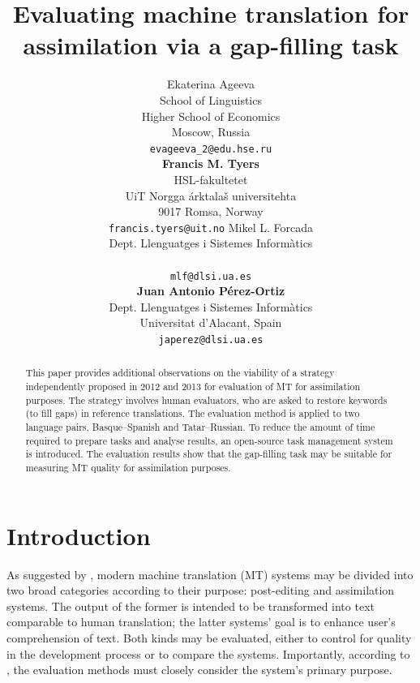 \documentclass[11pt]{article}
\title{Evaluating machine translation for assimilation via a gap-filling task}
\author{{Ekaterina Ageeva}\\
  {School of Linguistics}\\
  {Higher School of Economics}\\
  {Moscow, Russia}\\
  {{\tt evageeva\_2@edu.hse.ru}}\\[2ex]
  {\textbf{Francis M. Tyers}}\\
  {HSL-fakultetet}\\ 
  {UiT Norgga \'{a}rktala\v{s} universitehta} \\
  {9017 Romsa, Norway} \\
  {{\tt francis.tyers@uit.no}}
  \And
  {Mikel L. Forcada}\\
  {Dept. Llenguatges i Sistemes Inform\`{a}tics}\\
  \blankout{Universitat d'Alacant, Spain} \\
  {{\tt mlf@dlsi.ua.es}}  \\[2ex]
  {\textbf{Juan Antonio P\'{e}rez-Ortiz}} \\
  {Dept. Llenguatges i Sistemes Inform\`{a}tics}\\
  {Universitat d'Alacant, Spain} \\
  {{\tt japerez@dlsi.ua.es}}
}
\date{}
\begin{document}
\maketitle
\renewcommand{\baselinestretch}{0.97} %
\begin{abstract}
  This paper provides additional observations on the viability of a
  strategy independently proposed in 2012 and 2013 for evaluation of
 MT for assimilation purposes. The strategy involves
  human evaluators, who are asked to restore keywords (to fill gaps) in
  reference translations. The evaluation method is applied to two language pairs, Basque--Spanish and Tatar--Russian. To reduce the amount of time required to prepare tasks
  and analyse results, an open-source task management system is
  introduced. The evaluation results show that the gap-filling task may be suitable for measuring MT
  quality for assimilation purposes.
\end{abstract}

\section{Introduction}

As suggested by \citet{church93}, modern machine translation (MT) systems may
be divided into two broad categories according to their purpose: post-editing and assimilation systems. The output of the former is intended to be transformed into text comparable to human translation; the latter systems' goal is to enhance user's comprehension of text. Both kinds may be evaluated, either to control for quality in the development process or to compare the systems. Importantly, according to \citet{church93}, the evaluation methods must closely consider the system's primary purpose.
\end{document}

